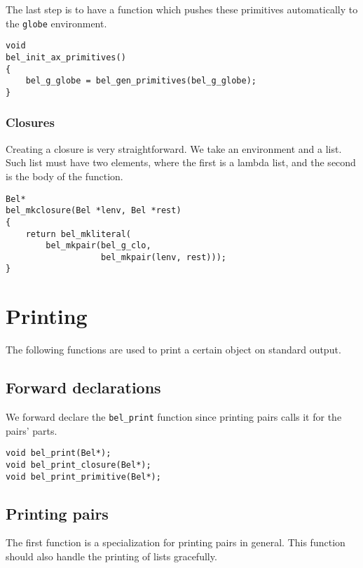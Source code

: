 \documentclass[openright,a4paper,twoside,12pt]{memoir}
\begin{document}
The last step is to have a function which pushes these primitives
automatically to the \texttt{globe} environment.

\begin{verbatim}
void
bel_init_ax_primitives()
{
    bel_g_globe = bel_gen_primitives(bel_g_globe);
}
\end{verbatim}

\subsection{Closures}
\label{sec:org3231c11}

Creating a closure is very straightforward. We take an environment and
a list. Such list must have two elements, where the first is a lambda
list, and the second is the body of the function.

\begin{verbatim}
Bel*
bel_mkclosure(Bel *lenv, Bel *rest)
{
    return bel_mkliteral(
        bel_mkpair(bel_g_clo,
                   bel_mkpair(lenv, rest)));
}
\end{verbatim}

\chapter{Printing}
\label{sec:org70df71e}

The following functions are used to print a certain object on standard
output.

\section{Forward declarations}
\label{sec:orgdbf1fcf}

We forward declare the \texttt{bel\_print} function since printing pairs calls
it for the pairs' parts.

\begin{verbatim}
void bel_print(Bel*);
void bel_print_closure(Bel*);
void bel_print_primitive(Bel*);
\end{verbatim}

\section{Printing pairs}
\label{sec:org4dfba07}

The first function is a specialization for printing pairs in
general. This function should also handle the printing of lists
gracefully.
\end{document}
